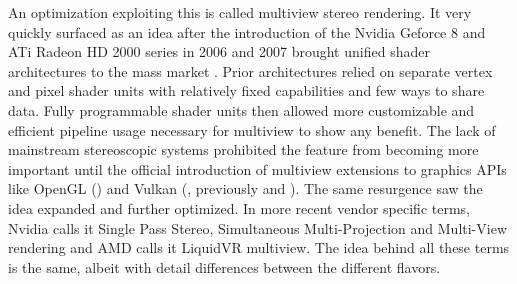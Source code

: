 An optimization exploiting this is called multiview stereo rendering. It very quickly surfaced as an idea after the introduction of the Nvidia Geforce 8 and ATi Radeon HD 2000 series in 2006 and 2007 brought unified shader architectures to the mass market \cite{Lindholm.2008}\cite{Sommefeldt.2007}. Prior architectures relied on separate vertex and pixel shader units with relatively fixed capabilities and few ways to share data. Fully programmable shader units then allowed more customizable and efficient pipeline usage necessary for multiview to show any benefit. 
The lack of mainstream stereoscopic systems prohibited the feature from becoming more important until the official introduction of multiview extensions to graphics APIs like OpenGL () and Vulkan (, previously  and ). 
The same resurgence saw the idea expanded and further optimized. In more recent vendor specific terms, Nvidia calls it Single Pass Stereo\cite{Cantlay.2016}, Simultaneous Multi-Projection\cite{Smith.2016} and Multi-View\cite{Bhonde.2018} rendering and AMD calls it LiquidVR multiview\cite{Gallagher.2016}\cite{Jez.2017}. The idea behind all these terms is the same, albeit with detail differences between the different flavors. \\

